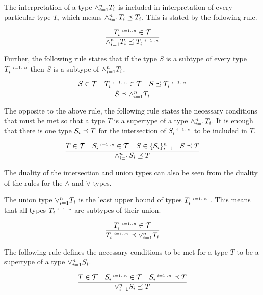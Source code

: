 \documentclass[runningheads]{llncs}
\newcommand{\s}{\scriptscriptstyle\ \,}
\newcommand{\T}{{\cal T}}
\begin{document}
The interpretation of a type $\land_{i=1}^n\/T_i$ is included in
interpretation of every particular type $T_i$ which means
$\land_{i=1}^n\/T_i\preceq\/T_i$. This is stated by the following
rule.

\begin{equation}
\label{rul:land-preceq-elems}
\dfrac{T_i^{\s\/i=1..n}\in\T}
      {\land_{i=1}^n\/T_i\preceq\/T_i^{\s\/i=1..n}} 
\end{equation}

Further, the following rule states that if the type $S$ is a subtype
of every type $T_i^{\s\/i=1..n}$ then $S$ is a subtype of
$\land_{i=1}^n\/T_i$.

\begin{equation}
\label{rul:lbound-preceq-land}
\dfrac{S\in\T\quad\/T_i^{\s\/i=1..n}\in\T\quad\/S\preceq\/T_i^{\s\/i=1..n}}
      {S\preceq\land_{i=1}^n\/T_i}  
\end{equation} 

The opposite to the above rule, the following rule states the
necessary conditions that must be met so that a type $T$ is a
supertype of a type $\land_{i=1}^n\/T_i$. It is enough that there is
one type $S_i\preceq\/T$ for the intersection of $S_i^{\s\/i=1..n}$ to
be included in $T$.

\begin{equation}
\label{rul:land-preceq-ubound}
\dfrac{T\in\T\quad\/S_i^{\s\/i=1..n}\in\T\quad\/S\in\{S_i\}_{i=1}^n\quad\/S\preceq\/T}
      {\land_{i=1}^n\/S_i\preceq\/T}  
\end{equation} 

The duality of the intersection and union types can also be seen from
the duality of the rules for the $\land$ and $\lor$-types.

The union type $\lor_{i=1}^n\/T_i$ is the least upper bound of
types $T_i^{\s\/i=1..n}$ \cite{Pierce1991}. This means that all types
$T_i^{\s\/i=1..n}$ are subtypes of their union. 

\begin{equation}
\label{rul:lor-preceq-elems}
\dfrac{T_i^{\s\/i=1..n}\in\T}
      {T_i^{\s\/i=1..n}\preceq\lor_{i=1}^n\/T_i}
\end{equation}

The following rule defines the necessary conditions to be met for a
type $T$ to be a supertype of a type $\lor_{i=1}^n\/S_i$.

\begin{equation}
\label{rul:lor-preceq-ubound}
\dfrac{T\in\T\quad\/S_i^{\s\/i=1..n}\in\T\quad\/S_i^{\s\/i=1..n}\preceq\/T}
      {\lor_{i=1}^n\/S_i\preceq\/T}  
\end{equation}
\end{document}
